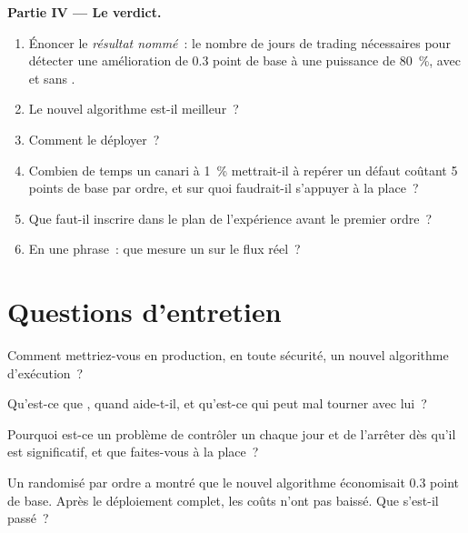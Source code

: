 \begin{problem}
\medskip\noindent\textbf{Partie IV --- Le verdict.}
\begin{enumerate}[resume]
\item Énoncer le \emph{résultat nommé}~: le nombre de jours de trading nécessaires pour détecter une amélioration de 0.3 point de base à une puissance de 80~\%, avec et sans .
\item Le nouvel algorithme est-il meilleur~?
\item Comment le déployer~?
\item Combien de temps un canari à 1~\% mettrait-il à repérer un défaut coûtant 5 points de base par ordre, et sur quoi faudrait-il s'appuyer à la place~?
\item Que faut-il inscrire dans le plan de l'expérience avant le premier ordre~?
\item En une phrase~: que mesure un  sur le flux réel~?
\end{enumerate}
\end{problem}

\section{Questions d'entretien}

\begin{interviewq}\label{iq:rs:live-experiments:1}
Comment mettriez-vous en production, en toute sécurité, un nouvel algorithme d'exécution~?
\end{interviewq}

\begin{interviewq}\label{iq:rs:live-experiments:2}
Qu'est-ce que , quand aide-t-il, et qu'est-ce qui peut mal tourner avec lui~?
\end{interviewq}

\begin{interviewq}\label{iq:rs:live-experiments:3}
Pourquoi est-ce un problème de contrôler un  chaque jour et de l'arrêter dès qu'il est significatif, et que faites-vous à la place~?
\end{interviewq}

\begin{interviewq}\label{iq:rs:live-experiments:4}
Un  randomisé par ordre a montré que le nouvel algorithme économisait 0.3 point de base. Après le déploiement complet, les coûts n'ont pas baissé. Que s'est-il passé~?
\end{interviewq}

